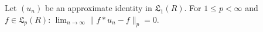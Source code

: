 Let $(u_n)$ be an approximate identity in $\mathfrak{L}_1(R)$. For $1 \leq p < \infty$ and $f \in \mathfrak{L}_p(R)$: $\lim_{n \to \infty} \|f * u_n - f\|_p = 0$.
